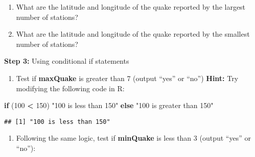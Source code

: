 \documentclass[
]{article}
\newenvironment{Shaded}{\begin{snugshade}}{\end{snugshade}}
\newcommand{\ControlFlowTok}[1]{\textcolor[rgb]{0.13,0.29,0.53}{\textbf{#1}}}
\newcommand{\DecValTok}[1]{\textcolor[rgb]{0.00,0.00,0.81}{#1}}
\newcommand{\NormalTok}[1]{#1}
\newcommand{\SpecialCharTok}[1]{\textcolor[rgb]{0.81,0.36,0.00}{\textbf{#1}}}
\newcommand{\StringTok}[1]{\textcolor[rgb]{0.31,0.60,0.02}{#1}}
\providecommand{\tightlist}{%
  \setlength{\itemsep}{0pt}\setlength{\parskip}{0pt}}
\begin{document}
\begin{enumerate}
\def\labelenumi{\Alph{enumi}.}
\setcounter{enumi}{6}
\item
  What are the latitude and longitude of the quake reported by the
  largest number of stations?
\item
  What are the latitude and longitude of the quake reported by the
  smallest number of stations?
\end{enumerate}

\textbf{Step 3:} Using conditional if statements

\begin{enumerate}
\def\labelenumi{\Roman{enumi}.}
\tightlist
\item
  Test if \textbf{maxQuake} is greater than 7 (output ``yes'' or ``no'')
  \textbf{Hint:} Try modifying the following code in R:
\end{enumerate}

\begin{Shaded}
\begin{Highlighting}[]
\ControlFlowTok{if}\NormalTok{  (}\DecValTok{100} \SpecialCharTok{\textless{}} \DecValTok{150}\NormalTok{) }\StringTok{"100 is less than 150"} \ControlFlowTok{else} \StringTok{"100 is greater than 150"}
\end{Highlighting}
\end{Shaded}

\begin{verbatim}
## [1] "100 is less than 150"
\end{verbatim}

\begin{enumerate}
\def\labelenumi{\Alph{enumi}.}
\setcounter{enumi}{9}
\tightlist
\item
  Following the same logic, test if \textbf{minQuake} is less than 3
  (output ``yes'' or ``no''):
\end{enumerate}
\end{document}
